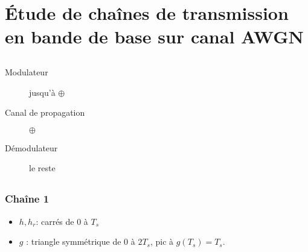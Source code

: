 \documentclass{article}
\begin{document}
\section{Étude de chaînes de transmission en bande de base sur canal AWGN}

\subsection{}
\begin{description}
    \item[Modulateur] jusqu'à $\oplus$
    \item[Canal de propagation] $\oplus$
    \item[Démodulateur] le reste
\end{description}

\subsection{}
\subsubsection{Chaîne 1}

\begin{itemize}
    \item 
$h, h_r$: carrés de 0 à $T_s$
\item  $g$ : triangle symmétrique de 0 à $2T_s$, pic à $g(T_s) = T_s$.
\end{itemize}
\end{document}
